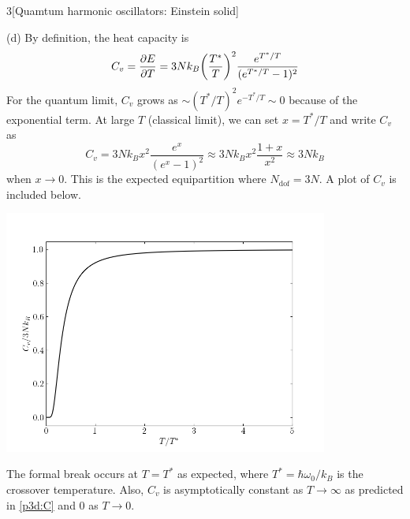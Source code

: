 \documentclass[12pt]{article}
\begin{document}
\begin{problem}{3}[Quamtum harmonic oscillators: Einstein solid]
\begin{solution}
(d) By definition, the heat capacity is
\begin{equation}
    C_v=\frac{\partial E}{\partial
    T}=3Nk_B\qty(\frac{T^\ast}{T})^2\frac{e^{T^\ast/T}}{(e^{T^\ast/T}-1)^2} 
\end{equation}
For the quantum limit, $C_v$ grows as $\sim (T^\ast/T)^2 e^{-T^\ast/T}\sim0$
because of the exponential term. At large $T$ (classical limit), we can set
$x=T^\ast/T$ and write $C_v$ as
\begin{equation}\label{p3d:C}
    C_v=3Nk_B x^2\frac{e^x}{(e^x-1)^2}\approx
    3Nk_Bx^2\frac{1+x}{x^2}\approx 3Nk_B
\end{equation}
when $x\to0$. This is the expected equipartition where $N_\text{dof}=3N$. A plot
of $C_v$ is included below.
\begin{center}
    \includegraphics[width=0.8\textwidth]{p3d.png} 
\end{center}
The formal break occurs at $T=T^\ast$ as expected, where
$T^\ast=\hbar\omega_0/k_B$ is the
crossover temperature. Also, $C_v$ is asymptotically constant as $T\to\infty$ as
predicted in \eqref{p3d:C} and 0 as $T\to0$.


\end{solution}
\end{problem}
\end{document}
